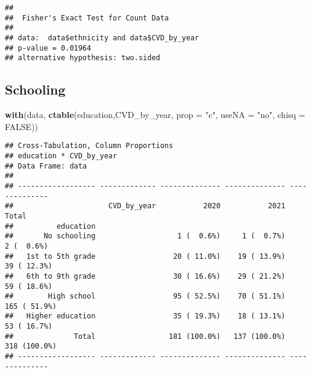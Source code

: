 \documentclass[
]{article}
\newenvironment{Shaded}{\begin{snugshade}}{\end{snugshade}}
\newcommand{\AttributeTok}[1]{\textcolor[rgb]{0.13,0.29,0.53}{#1}}
\newcommand{\ConstantTok}[1]{\textcolor[rgb]{0.56,0.35,0.01}{#1}}
\newcommand{\FunctionTok}[1]{\textcolor[rgb]{0.13,0.29,0.53}{\textbf{#1}}}
\newcommand{\NormalTok}[1]{#1}
\newcommand{\SpecialCharTok}[1]{\textcolor[rgb]{0.81,0.36,0.00}{\textbf{#1}}}
\newcommand{\StringTok}[1]{\textcolor[rgb]{0.31,0.60,0.02}{#1}}
\begin{document}
\begin{Shaded}
\end{Shaded}

\begin{verbatim}
## 
##  Fisher's Exact Test for Count Data
## 
## data:  data$ethnicity and data$CVD_by_year
## p-value = 0.01964
## alternative hypothesis: two.sided
\end{verbatim}

\hypertarget{schooling}{%
\subsection{Schooling}\label{schooling}}

\begin{Shaded}
\begin{Highlighting}[]
\FunctionTok{with}\NormalTok{(data, }\FunctionTok{ctable}\NormalTok{(education,CVD\_by\_year, }\AttributeTok{prop =} \StringTok{"c"}\NormalTok{, }\AttributeTok{useNA =} \StringTok{"no"}\NormalTok{, }\AttributeTok{chisq =} \ConstantTok{FALSE}\NormalTok{))}
\end{Highlighting}
\end{Shaded}

\begin{verbatim}
## Cross-Tabulation, Column Proportions  
## education * CVD_by_year  
## Data Frame: data  
## 
## ------------------ ------------- -------------- -------------- --------------
##                      CVD_by_year           2020           2021          Total
##          education                                                           
##       No schooling                   1 (  0.6%)     1 (  0.7%)     2 (  0.6%)
##   1st to 5th grade                  20 ( 11.0%)    19 ( 13.9%)    39 ( 12.3%)
##   6th to 9th grade                  30 ( 16.6%)    29 ( 21.2%)    59 ( 18.6%)
##        High school                  95 ( 52.5%)    70 ( 51.1%)   165 ( 51.9%)
##   Higher education                  35 ( 19.3%)    18 ( 13.1%)    53 ( 16.7%)
##              Total                 181 (100.0%)   137 (100.0%)   318 (100.0%)
## ------------------ ------------- -------------- -------------- --------------
\end{verbatim}

\begin{Shaded}
\end{Shaded}
\end{document}

